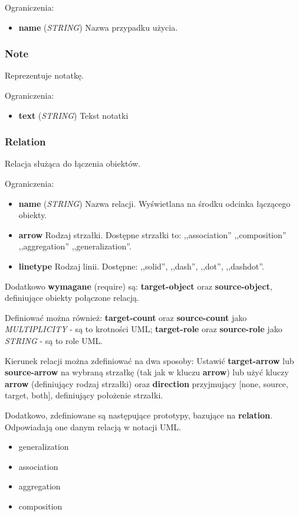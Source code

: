 Ograniczenia:
\begin{itemize}
	\item \textbf{name} (\emph{STRING}) Nazwa przypadku użycia.
\end{itemize}

\subsubsection{Note}
Reprezentuje notatkę.

Ograniczenia:
\begin{itemize}
	\item \textbf{text} (\emph{STRING}) Tekst notatki
\end{itemize}
	
\subsubsection{Relation}
Relacja służąca do łączenia obiektów.

Ograniczenia:
\begin{itemize}
	\item \textbf{name} (\emph{STRING}) Nazwa relacji. Wyświetlana na środku odcinka łączącego obiekty.
	\item \textbf{arrow} Rodzaj strzałki. Dostępne strzałki to: ,,association'' ,,composition'' ,,aggregation'' ,,generalization''.
	\item \textbf{linetype} Rodzaj linii. Dostępne: ,,solid'', ,,dash'', ,,dot'', ,,dashdot''.
\end{itemize}

Dodatkowo \textbf{wymagane} (require) są: \textbf{target-object} oraz \textbf{source-object}, definiujące obiekty połączone relacją.

Definiować można również: \textbf{target-count} oraz \textbf{source-count} jako \emph{MULTIPLICITY} - są to krotności UML; \textbf{target-role} oraz \textbf{source-role} jako \emph{STRING} - są to role UML.

Kierunek relacji można zdefiniować na dwa sposoby: Ustawić \textbf{target-arrow} lub \textbf{source-arrow} na wybraną strzałkę (tak jak w kluczu \textbf{arrow}) lub użyć kluczy \textbf{arrow} (definiujący rodzaj strzałki) oraz \textbf{direction} przyjmujący [none, source, target, both], definiujący położenie strzałki.

Dodatkowo, zdefiniowane są następujące prototypy, bazujące na \textbf{relation}. Odpowiadają one danym relacją w notacji UML.
\begin{itemize}
	\item generalization
	\item association
	\item aggregation
	\item composition
\end{itemize}